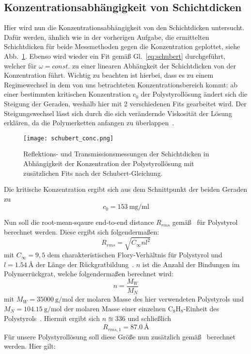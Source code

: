 \subsection{Konzentrationsabhängigkeit von Schichtdicken}

Hier wird nun die Konzentrationsabhängigkeit von den Schichtdicken untersucht. Dafür werden, ähnlich wie in der vorherigen Aufgabe, die ermittelten Schichtdicken für beide Messmethoden gegen die Konzentration geplottet, siehe Abb.~\ref{fig:concentration}. Ebenso wird wieder ein Fit gemäß Gl.~\eqref{eq:schubert} durchgeführt, welcher für $\omega = const.$ zu einer linearen Abhängkeit der Schichtdicken von der Konzentration führt. Wichtig zu beachten ist hierbei, dass es zu einem Regimewechsel in dem von uns betrachteten Konzentrationsbereich kommt: ab einer bestimmten kritischen Konzentration $c_0$ der Polystyrollösung ändert sich die Steigung der Geraden, weshalb hier mit 2 verschiedenen Fits gearbeitet wird. Der Steigungswechsel lässt sich durch die sich verändernde Viskosität der Lösung erklären, da die Polymerketten anfangen zu überlappen~\cite[]{Daum}. 

\begin{figure}
    \centering
    \texttt{[image: schubert\_conc.png]}
    \caption{Reflektions- und Transmissionsmessungen der Schichtdicken in Abhängigkeit der Konzentration der Polystyrollösung mit zusätzlichen Fits nach der Schubert-Gleichung.}
    \label{fig:concentration}
\end{figure}

Die kritische Konzentration ergibt sich aus dem Schnittpunkt der beiden Geraden zu 
\begin{equation*}
    c_0 = \SI{153}{\milli\gram\per\milli\litre}
\end{equation*}

Nun soll die root-mean-sqaure end-to-end distance $R_{rms}$ gemäß~\cite[]{properties} für Polystyrol berechnet werden. Diese ergibt sich folgendermaßen:
\begin{equation}\label{eq:rms}
    R_{rms} = \sqrt{C_\infty n l^2}
\end{equation}
mit $C_\infty = 9,5$ dem charakteristischen Flory-Verhältnis für Polystyrol und $l = \SI{1,54}{\angstrom}$ der Länge der Rückgratbildung~\cite[]{Anleitung}. $n$ ist die Anzahl der Bindungen im Polymerrückgrat, welche folgendermaßen berechnet wird:
\begin{equation}
    n = \frac{M_W}{M_N}
\end{equation}
mit $M_W = \SI{35000}{\gram\per\mol}$ der molaren Masse des hier verwendeten Polystyrols und $M_N = \SI{104,15}{\gram\per\mol}$ der molaren Masse einer einzelnen $\mathrm{C}_8\mathrm{H}_8$-Einheit des Polystyrols~\cite[]{properties}. Hiermit ergibt sich $n \approxeq \num{336}$ und schließlich
\begin{equation*}
    R_{rms, 1} = \SI{87,0}{\angstrom}
\end{equation*}
Für unsere Polystyrollösung soll diese Größe nun zusätzlich gemäß~\cite[]{Daum} berechnet werden. Hier gilt:

